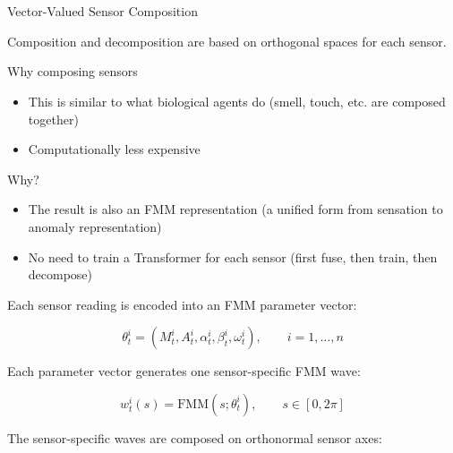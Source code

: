 \section{}
    \begin{frame}[allowframebreaks]{Vector-Valued Sensor Composition}
        
        Composition and decomposition are based on orthogonal spaces for each sensor.
        \begin{block}{Why composing sensors}
            \begin{itemize}
                \item This is similar to what biological agents do (smell, touch, etc. are composed together)
                \item Computationally less expensive
            \end{itemize}
        \end{block}
        
        
        \begin{block}{Why?}
            \begin{itemize}
                \item The result is also an FMM representation (a unified form from sensation to anomaly representation)
                \item No need to train a Transformer for each sensor (first fuse, then train, then decompose)
            \end{itemize}
            
        \end{block}
        
        \small
        
        Each sensor reading is encoded into an FMM parameter vector:
        
        \begin{equation}
            \theta_t^i
            =
            (M_t^i,A_t^i,\alpha_t^i,\beta_t^i,\omega_t^i),
            \qquad
            i=1,\ldots,n
        \end{equation}
        
        Each parameter vector generates one sensor-specific FMM wave:
        
        \begin{equation}
            w_t^i(s)
            =
            \mathrm{FMM}(s;\theta_t^i),
            \qquad
            s \in [0,2\pi]
        \end{equation}
        
        The sensor-specific waves are composed on orthonormal sensor axes:
        

\end{frame}
